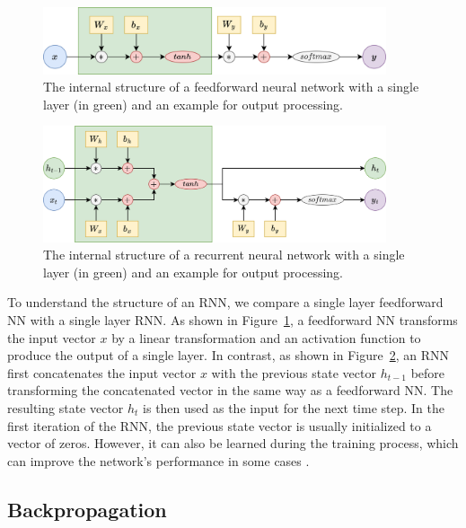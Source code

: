 \documentclass{article}
\newcommand{\reffig}[1]{Figure~\ref{#1}}
\begin{document}
\begin{figure}[htbp]
  \centering
  \includegraphics[width=0.9\textwidth]{Block Diagram Feedforward.drawio.png}
  \caption{The internal structure of a feedforward neural network with a single layer (in
    green) and an example for output processing.}
  \label{fig:internal-feedforward}
\end{figure}

\begin{figure}[htbp]
  \centering
  \includegraphics[width=0.9\textwidth]{Block Diagram RNN.drawio.png}
  \caption{The internal structure of a recurrent neural network with a single layer (in
    green) and an example for output processing.}
  \label{fig:internal-rnn}
\end{figure}

To understand the structure of an RNN, we compare a single layer feedforward NN with a
single layer RNN. As shown in \reffig{fig:internal-feedforward}, a feedforward NN
transforms the input vector $x$ by a linear transformation and an activation function to
produce the output of a single layer. In contrast, as shown in \reffig{fig:internal-rnn},
an RNN first concatenates the input vector $x$ with the previous state vector $h_{t-1}$
before transforming the concatenated vector in the same way as a feedforward NN. The
resulting state vector $h_t$ is then used as the input for the next time step. In the
first iteration of the RNN, the previous state vector is usually initialized to a vector
of zeros. However, it can also be learned during the training process, which can improve
the network's performance in some cases
\cite{sutskeverImportanceInitializationMomentum2013}.


\subsection{Backpropagation}
\label{sec:2.2}
\end{document}

